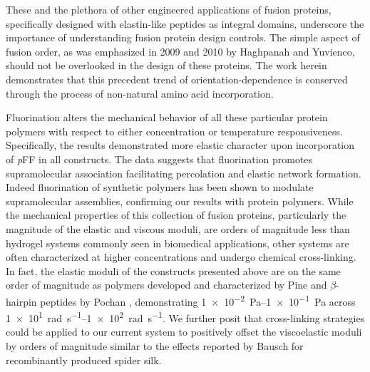 \begin{refsection}
These and the plethora of other engineered applications of fusion proteins,
specifically designed with elastin-like peptides as integral domains, underscore
the importance of understanding fusion protein design controls. The simple
aspect of fusion order, as was emphasized in 2009 and 2010 by Haghpanah and
Yuvienco,\cite{Haghpanah2009,Haghpanah2010} should not be overlooked in the
design of these proteins. The work herein demonstrates that this precedent trend
of orientation-dependence is conserved through the process of non-natural amino
acid incorporation.

Fluorination alters the mechanical behavior of all these particular protein
polymers with respect to either concentration or temperature responsiveness.
Specifically, the results demonstrated more elastic character upon incorporation
of \emph{p}FF in all constructs. The data suggests that fluorination promotes
supramolecular association facilitating percolation and elastic network
formation.\cite{Veerman2006,Safran1985,VanderLinden2001} Indeed fluorination of
synthetic polymers has been shown to modulate supramolecular assemblies,
confirming our results with protein
polymers.\cite{Percec2005,Krafft1993,Krafft1994,Krafft2001} While the mechanical
properties of this collection of fusion proteins, particularly the magnitude of
the elastic and viscous moduli, are orders of magnitude less than hydrogel
systems commonly seen in biomedical applications, other systems are often
characterized at higher concentrations and undergo chemical
cross-linking.\cite{Krishna2010,Yan2010a,Rammensee2008,Breedveld2004,Schneider2002}
In fact, the elastic moduli of the constructs presented above are on the same
order of magnitude as 
polymers developed and characterized by Pine  and
${\beta}$-hairpin peptides by Pochan , demonstrating
\SIrange[scientific-notation=true,retain-unity-mantissa=false]{1e-2}{1e-1}{\pascal}
across
\SIrange[scientific-notation=true,retain-unity-mantissa=false]{1e1}{1e2}{\radian\per\s}.
\cite{Breedveld2004,Yucel2008} We further posit that cross-linking strategies
could be applied to our current system to positively offset the viscoelastic
moduli by orders of magnitude similar to the effects reported by Bausch
 for recombinantly produced spider
silk.\cite{Rammensee2008,Breedveld2004,Yucel2008}


\end{refsection}
